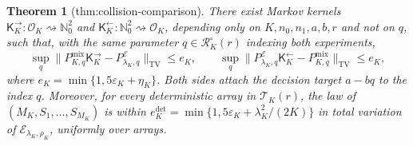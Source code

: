 \documentclass{article}
\newtheorem{theorem}{Theorem}
\begin{document}
\begin{theorem}[thm:collision-comparison]\label{thm:collision-comparison}
There exist Markov kernels \(\mathsf K_K^{\to}:\mathcal O_K\rightsquigarrow\mathbb N_0^2\) and \(\mathsf K_K^{\leftarrow}:\mathbb N_0^2\rightsquigarrow\mathcal O_K\), depending only on \(K,n_0,n_1,a,b,r\) and not on \(q\), such that, with the same parameter \(q\in\mathcal R_K^{\circ}(r)\) indexing both experiments, \[\sup_q\lVert P^{\mathrm{mix}}_{K,q}\mathsf K_K^{\to}-P^{\mathcal E}_{\lambda_K,q}\rVert_{\mathrm{TV}}\le e_K,\qquad \sup_q\lVert P^{\mathcal E}_{\lambda_K,q}\mathsf K_K^{\leftarrow}-P^{\mathrm{mix}}_{K,q}\rVert_{\mathrm{TV}}\le e_K,\] where \(e_K=\min\{1,5\varepsilon_K+\eta_K\}\). Both sides attach the decision target \(a-bq\) to the index \(q\). Moreover, for every deterministic array in \(\mathcal T_K(r)\), the law of \((M_K,S_1,\ldots,S_{M_K})\) is within \(e_K^{\mathrm{det}}=\min\{1,5\varepsilon_K+\lambda_K^2/(2K)\}\) in total variation of \(\mathcal E_{\lambda_K,\rho_K}\), uniformly over arrays.
\end{theorem}
\end{document}
